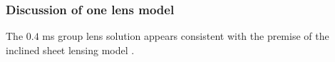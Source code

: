 \documentclass[useAMS,usenatbib]{mn2e}
\begin{document}




\subsubsection{Discussion of one lens model}

The $0.4$ ms group lens solution appears consistent with the premise of the inclined
sheet lensing model \citep{2014MNRAS.442.3338P}.
\end{document}
